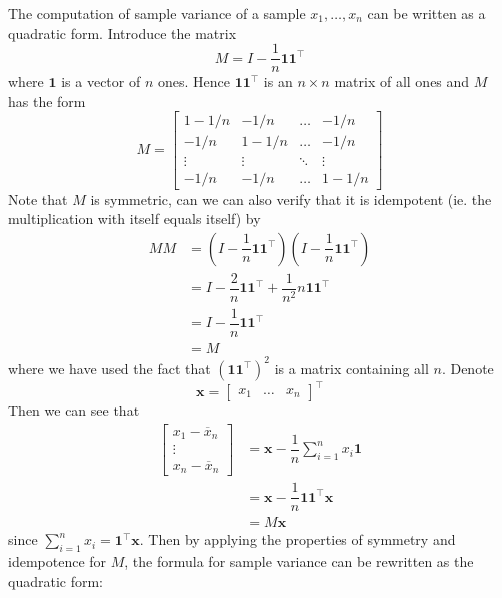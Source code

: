 \documentclass[11pt]{report} %
\begin{document}
The computation of sample variance of a sample $x_{1}, \dots, x_{n}$ can be written as a quadratic form. Introduce the matrix
\begin{equation}
M = I - \dfrac{1}{n}\mathbf{1}\mathbf{1}^{\top}
\end{equation}
where $\mathbf{1}$ is a vector of $n$ ones. Hence $\mathbf{1}\mathbf{1}^{\top}$ is an $n\times n$ matrix of all ones and $M$ has the form
\begin{equation}
M=\begin{bmatrix}1-1/n & -1/n & \dots & -1/n\\
-1/n & 1-1/n & \dots & -1/n\\
\vdots & \vdots & \ddots & \vdots\\
-1/n & -1/n & \dots & 1-1/n
\end{bmatrix}
\end{equation}
Note that $M$ is symmetric, can we can also verify that it is idempotent (ie. the multiplication with itself equals itself) by
\begin{align}
MM &= \left(I - \dfrac{1}{n}\mathbf{1}\mathbf{1}^{\top}\right)\left(I - \dfrac{1}{n}\mathbf{1}\mathbf{1}^{\top}\right) \\
&= I - \dfrac{2}{n}\mathbf{1}\mathbf{1}^{\top} + \dfrac{1}{n^{2}}n\mathbf{1}\mathbf{1}^{\top} \\
&= I - \dfrac{1}{n}\mathbf{1}\mathbf{1}^{\top} \\
&= M
\end{align}
where we have used the fact that $\left(\mathbf{1}\mathbf{1}^{\top}\right)^{2}$ is a matrix containing all $n$. Denote
\begin{equation}
\mathbf{x} = \begin{bmatrix}x_{1} & \dots & x_{n}\end{bmatrix}^{\top}
\end{equation}
Then we can see that
\begin{align}
\begin{bmatrix}
x_{1} - \overline{x}_{n} \\ \vdots \\ x_{n} - \overline{x}_{n}
\end{bmatrix} &= \mathbf{x} - \dfrac{1}{n}\sum_{i = 1}^{n}x_{i}\mathbf{1} \\
&=  \mathbf{x} - \dfrac{1}{n}\mathbf{1}\mathbf{1}^{\top}\mathbf{x} \\
&= M\mathbf{x}
\end{align}
since $\sum_{i = 1}^{n}x_{i} = \mathbf{1}^{\top}\mathbf{x}$. Then by applying the properties of symmetry and idempotence for $M$, the formula for sample variance can be rewritten as the quadratic form:
\end{document}
